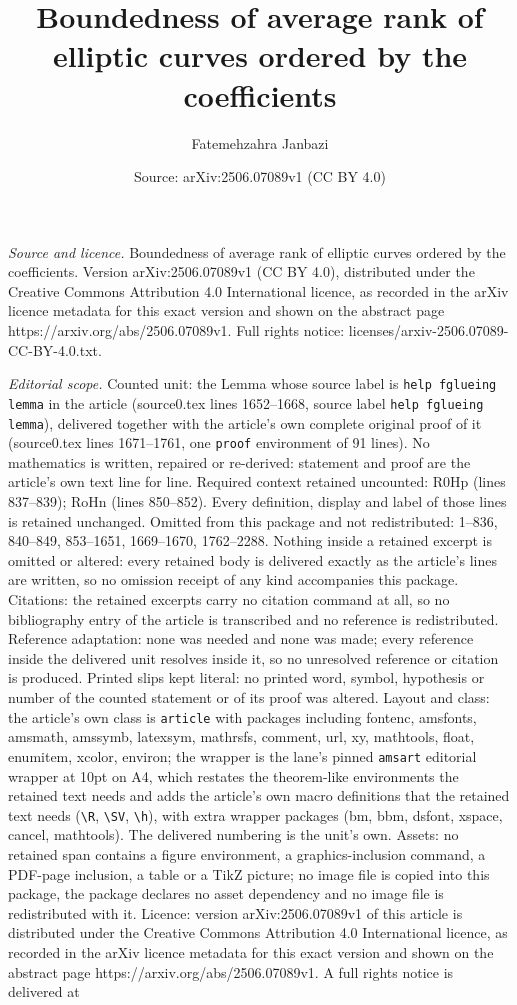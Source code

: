 \documentclass[10pt,a4paper]{amsart}
\title[Boundedness of average rank of elliptic curves ordered by th]{Boundedness of average rank of elliptic curves ordered by the coefficients}
\author{Fatemehzahra Janbazi}
\date{Source: arXiv:2506.07089v1 (CC BY 4.0)}
\begin{document}
\maketitle

\noindent\emph{Source and licence.} Boundedness of average rank of elliptic curves ordered by the coefficients. Version arXiv:2506.07089v1 (CC BY 4.0), distributed under the Creative Commons Attribution 4.0 International licence, as recorded in the arXiv licence metadata for this exact version and shown on the abstract page https://arxiv.org/abs/2506.07089v1. Full rights notice: licenses/arxiv-2506.07089-CC-BY-4.0.txt.\par\smallskip

\noindent\textit{Editorial scope.} Counted unit: the Lemma whose source label is \texttt{help fglueing lemma} in the article (source0.tex lines 1652--1668, source label \texttt{help fglueing lemma}), delivered together with the article's own complete original proof of it (source0.tex lines 1671--1761, one \texttt{proof} environment of 91 lines). No mathematics is written, repaired or re-derived: statement and proof are the article's own text line for line. Required context retained uncounted: R0Hp (lines 837--839); RoHn (lines 850--852). Every definition, display and label of those lines is retained unchanged. Omitted from this package and not redistributed: 1--836, 840--849, 853--1651, 1669--1670, 1762--2288. Nothing inside a retained excerpt is omitted or altered: every retained body is delivered exactly as the article's lines are written, so no omission receipt of any kind accompanies this package. Citations: the retained excerpts carry no citation command at all, so no bibliography entry of the article is transcribed and no reference is redistributed. Reference adaptation: none was needed and none was made; every reference inside the delivered unit resolves inside it, so no unresolved reference or citation is produced. Printed slips kept literal: no printed word, symbol, hypothesis or number of the counted statement or of its proof was altered. Layout and class: the article's own class is \texttt{article} with packages including fontenc, amsfonts, amsmath, amssymb, latexsym, mathrsfs, comment, url, xy, mathtools, float, enumitem, xcolor, environ; the wrapper is the lane's pinned \texttt{amsart} editorial wrapper at 10pt on A4, which restates the theorem-like environments the retained text needs and adds the article's own macro definitions that the retained text needs (\texttt{\textbackslash R}, \texttt{\textbackslash SV}, \texttt{\textbackslash h}), with extra wrapper packages (bm, bbm, dsfont, xspace, cancel, mathtools). The delivered numbering is the unit's own. Assets: no retained span contains a figure environment, a graphics-inclusion command, a PDF-page inclusion, a table or a TikZ picture; no image file is copied into this package, the package declares no asset dependency and no image file is redistributed with it. Licence: version arXiv:2506.07089v1 of this article is distributed under the Creative Commons Attribution 4.0 International licence, as recorded in the arXiv licence metadata for this exact version and shown on the abstract page https://arxiv.org/abs/2506.07089v1. A full rights notice is delivered at 
\end{document}
